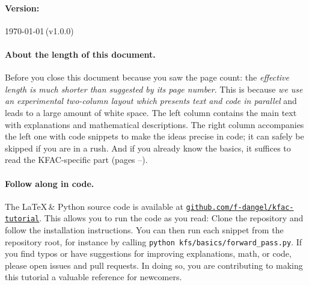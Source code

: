\vfill

\paragraph{Version:} \today\,(v1.0.0)

\paragraph{About the length of this document.}
Before you close this document because you saw the page count:
the \emph{effective length is much shorter than suggested by its page number}.
This is because \emph{we use an experimental two-column layout which presents text and code in parallel} and leads to a large amount of white space.
The left column contains the main text with explanations and mathematical descriptions.
The right column accompanies the left one with code snippets to make the ideas precise in code; it can safely be skipped if you are in a rush.
And if you already know the basics, it suffices to read the KFAC-specific part (pages \pageref{sec:kfac-overview}--\pageref{sec:kfac-cheatsheet}).

\paragraph{Follow along in code.} The \LaTeX\,\& Python source code is available at \href{\repourl}{\texttt{github.com/f-dangel/kfac-tutorial}}.
This allows you to run the code as you read:
Clone the repository and follow the installation instructions.
You can then run each snippet from the repository root, for instance by calling \texttt{python kfs/basics/forward\_pass.py}.
If you find typos or have suggestions for improving explanations, math, or code, please open issues and pull requests.
In doing so, you are contributing to making this tutorial a valuable reference for newcomers.

\vspace{\baselineskip}
